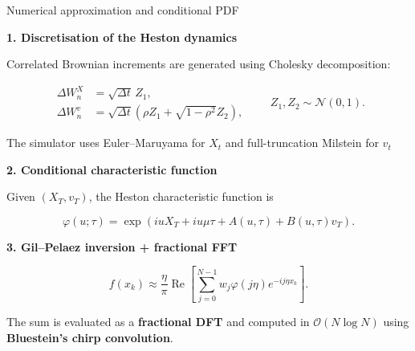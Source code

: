 \begin{frame}{Numerical approximation and conditional PDF}

\textbf{1. Discretisation of the Heston dynamics}

Correlated Brownian increments are generated using Cholesky decomposition:

\begin{equation}
\begin{aligned}
\Delta W_n^X
&= \sqrt{\Delta t}\,Z_1,\\
\Delta W_n^v
&= \sqrt{\Delta t}
\left(\rho Z_1+\sqrt{1-\rho^2}Z_2\right),
\end{aligned}
\qquad
Z_1,Z_2\sim\mathcal{N}(0,1).
\end{equation}

The simulator uses Euler--Maruyama for $X_t$ and
full-truncation Milstein for $v_t$

\vspace{0.1cm}

\textbf{2. Conditional characteristic function}

Given $(X_T,v_T)$, the Heston characteristic function is

\begin{equation}
\varphi(u;\tau)
=
\exp\!\left(
iuX_T+iu\mu\tau+A(u,\tau)+B(u,\tau)v_T
\right).
\end{equation}

\vspace{0.05cm}

\textbf{3. Gil--Pelaez inversion + fractional FFT}

\begin{equation}
f(x_k)
\approx
\frac{\eta}{\pi}
\operatorname{Re}
\left[
\sum_{j=0}^{N-1}
w_j\varphi(j\eta)
e^{-ij\eta x_k}
\right].
\end{equation}

The sum is evaluated as a \textbf{fractional DFT} and computed in
$\mathcal{O}(N\log N)$ using \textbf{Bluestein's chirp convolution}.

\end{frame}


